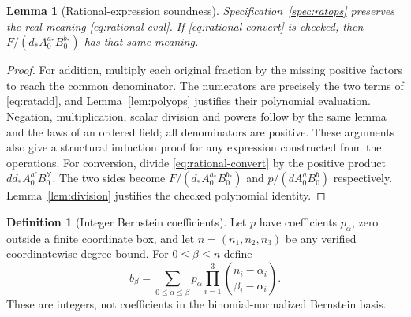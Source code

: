 \documentclass[11pt,a4paper]{article}
\newtheorem{lemma}{Lemma}[section]
\theoremstyle{definition}
\newtheorem{definition}{Definition}[section]
\newcommand{\E}[2]{\refstepcounter{equation}\[#2\tag{\theequation}\label{eq:#1}\]}
\begin{document}
\begin{lemma}[Rational-expression soundness]\label{lem:rational}
Specification~\ref{spec:ratops} preserves the real meaning \eqref{eq:rational-eval}. If \eqref{eq:rational-convert} is checked, then $F/(d_*A_0^{a_*}B_0^{b_*})$ has that same meaning.
\end{lemma}
\begin{proof}
For addition, multiply each original fraction by the missing positive factors to reach the common denominator. The numerators are precisely the two terms of \eqref{eq:ratadd}, and Lemma~\ref{lem:polyops} justifies their polynomial evaluation. Negation, multiplication, scalar division and powers follow by the same lemma and the laws of an ordered field; all denominators are positive. These arguments also give a structural induction proof for any expression constructed from the operations.
For conversion, divide \eqref{eq:rational-convert} by the positive product
$d d_* A_0^{a'}B_0^{b'}$. The two sides become $F/(d_*A_0^{a_*}B_0^{b_*})$ and $p/(dA_0^aB_0^b)$ respectively. Lemma~\ref{lem:division} justifies the checked polynomial identity.
\end{proof}

\begin{definition}[Integer Bernstein coefficients]\label{def:bernstein}
Let $p$ have coefficients $p_\alpha$, zero outside a finite coordinate box, and let $n=(n_1,n_2,n_3)$ be any verified coordinatewise degree bound. For $0\leq\beta\leq n$ define
\E{bernstein-coeff}{b_\beta=\sum_{0\leq\alpha\leq\beta}p_\alpha
       \prod_{i=1}^3\binom{n_i-\alpha_i}{\beta_i-\alpha_i}.}
These are integers, not coefficients in the binomial-normalized Bernstein basis.
\end{definition}
\end{document}
